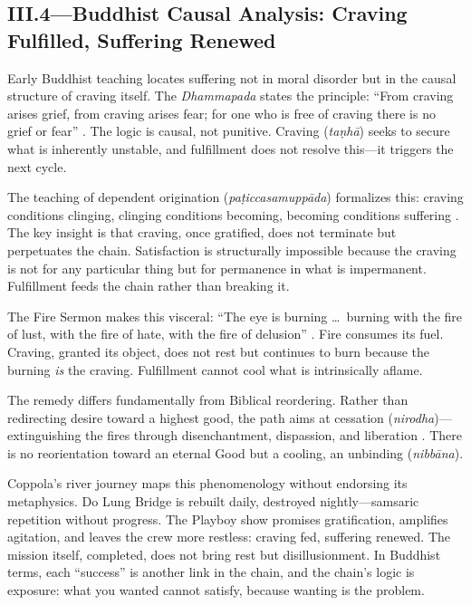 \subsection*{III.4—Buddhist Causal Analysis: Craving Fulfilled, Suffering Renewed}
\label{ssec:iii-buddhist-causal-analysis}

Early Buddhist teaching locates suffering not in moral disorder but in the causal structure of
craving itself. The \emph{Dhammapada} states the principle: ``From craving arises grief, from
craving arises fear; for one who is free of craving there is no grief or fear''
\parencite{BuddharakkhitaDhp1993}. The logic is causal, not punitive. Craving (\emph{taṇhā})
seeks to secure what is inherently unstable, and fulfillment does not resolve this---it
triggers the next cycle.

The teaching of dependent origination (\emph{paṭiccasamuppāda}) formalizes this:
craving conditions clinging, clinging conditions becoming, becoming conditions suffering
\parencite{BodhiSN2000}. The key insight is that craving, once gratified, does not terminate
but perpetuates the chain. Satisfaction is structurally impossible because the craving is not
for any particular thing but for permanence in what is impermanent. Fulfillment feeds the
chain rather than breaking it.

The Fire Sermon makes this visceral: ``The eye is burning \ldots\ burning with the fire of
lust, with the fire of hate, with the fire of delusion'' \parencite{BodhiSN2000}. Fire
consumes its fuel. Craving, granted its object, does not rest but continues to burn because
the burning \emph{is} the craving. Fulfillment cannot cool what is intrinsically aflame.

The remedy differs fundamentally from Biblical reordering. Rather than redirecting desire
toward a highest good, the path aims at cessation (\emph{nirodha})---extinguishing the fires
through disenchantment, dispassion, and liberation \parencite{Rahula1959}. There is no
reorientation toward an eternal Good but a cooling, an unbinding (\emph{nibbāna}).

Coppola's river journey maps this phenomenology without endorsing its metaphysics. Do Lung
Bridge is rebuilt daily, destroyed nightly---samsaric repetition without progress. The Playboy
show promises gratification, amplifies agitation, and leaves the crew more restless: craving
fed, suffering renewed. The mission itself, completed, does not bring rest but disillusionment.
In Buddhist terms, each ``success'' is another link in the chain, and the chain's logic is
exposure: what you wanted cannot satisfy, because wanting is the problem.
